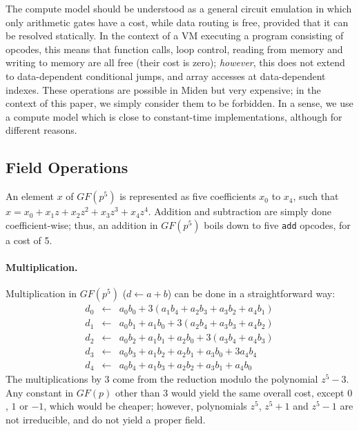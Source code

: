 \documentclass{llncs}
\newcommand{\GF}{GF}
\begin{document}
The compute model should be understood as a general circuit emulation in
which only arithmetic gates have a cost, while data routing is free,
provided that it can be resolved statically. In the context of a VM
executing a program consisting of opcodes, this means that function
calls, loop control, reading from memory and writing to memory are all
free (their cost is zero); \emph{however}, this does not extend to
data-dependent conditional jumps, and array accesses at data-dependent
indexes. These operations are possible in Miden but very expensive; in
the context of this paper, we simply consider them to be forbidden. In a
sense, we use a compute model which is close to constant-time
implementations, although for different reasons.

\subsection{Field Operations}\label{sec:invm-field}

An element $x$ of $\GF(p^5)$ is represented as five coefficients $x_0$
to $x_4$, such that $x = x_0 + x_1 z + x_2 z^2 + x_3 z^3 + x_4 z^4$.
Addition and subtraction are simply done coefficient-wise; thus, an
addition in $\GF(p^5)$ boils down to five \verb+add+ opcodes, for a cost
of 5.

\paragraph{Multiplication.} Multiplication in $\GF(p^5)$ ($d\leftarrow a
+ b$) can be done in a straightforward way:
\begin{eqnarray*}
    d_0 &\leftarrow& a_0 b_0 + 3 (a_1 b_4 + a_2 b_3 + a_3 b_2 + a_4 b_1) \\
    d_1 &\leftarrow& a_0 b_1 + a_1 b_0 + 3 (a_2 b_4 + a_3 b_3 + a_4 b_2) \\
    d_2 &\leftarrow& a_0 b_2 + a_1 b_1 + a_2 b_0 + 3 (a_3 b_4 + a_4 b_3) \\
    d_3 &\leftarrow& a_0 b_3 + a_1 b_2 + a_2 b_1 + a_3 b_0 + 3 a_4 b_4 \\
    d_4 &\leftarrow& a_0 b_4 + a_1 b_3 + a_2 b_2 + a_3 b_1 + a_4 b_0
\end{eqnarray*}
The multiplications by 3 come from the reduction modulo the polynomial
$z^5 - 3$. Any constant in $\GF(p)$ other than 3 would yield the same
overall cost, except $0$, $1$ or $-1$, which would be cheaper; however,
polynomials $z^5$, $z^5+1$ and $z^5-1$ are not irreducible, and do not
yield a proper field.
\end{document}

